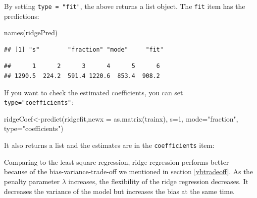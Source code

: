 \documentclass[
  12pt,
]{krantz}
\makeatletter
\newenvironment{Shaded}{\begin{snugshade}}{\end{snugshade}}
\newcommand{\AttributeTok}[1]{\textcolor[rgb]{0.61,0.61,0.61}{#1}}
\newcommand{\CommentTok}[1]{\textcolor[rgb]{0.37,0.37,0.37}{\textit{#1}}}
\newcommand{\DecValTok}[1]{\textcolor[rgb]{0.06,0.06,0.06}{#1}}
\newcommand{\FunctionTok}[1]{\textcolor[rgb]{0,0,0}{#1}}
\newcommand{\NormalTok}[1]{#1}
\newcommand{\OtherTok}[1]{\textcolor[rgb]{0.37,0.37,0.37}{#1}}
\newcommand{\SpecialCharTok}[1]{\textcolor[rgb]{0,0,0}{#1}}
\newcommand{\StringTok}[1]{\textcolor[rgb]{0.5,0.5,0.5}{#1}}
\newenvironment{kframe}{%
\medskip{}
\setlength{\fboxsep}{.8em}
 \def\at@end@of@kframe{}%
 \ifinner\ifhmode%
  \def\at@end@of@kframe{\end{minipage}}%
  \begin{minipage}{\columnwidth}%
 \fi\fi%
 \def\FrameCommand##1{\hskip\@totalleftmargin \hskip-\fboxsep
 \colorbox{shadecolor}{##1}\hskip-\fboxsep
     \hskip-\linewidth \hskip-\@totalleftmargin \hskip\columnwidth}%
 \MakeFramed {\advance\hsize-\width
   \@totalleftmargin\z@ \linewidth\hsize
   \@setminipage}}%
 {\par\unskip\endMakeFramed%
 \at@end@of@kframe}
\renewenvironment{Shaded}{\begin{kframe}}{\end{kframe}}
\makeatother
\begin{document}
By setting \texttt{type\ =\ "fit"}, the above returns a list object. The \texttt{fit} item has the predictions:

\begin{Shaded}
\begin{Highlighting}[]
\FunctionTok{names}\NormalTok{(ridgePred)}
\end{Highlighting}
\end{Shaded}

\begin{verbatim}
## [1] "s"        "fraction" "mode"     "fit"
\end{verbatim}

\begin{Shaded}
\end{Shaded}

\begin{verbatim}
##      1      2      3      4      5      6 
## 1290.5  224.2  591.4 1220.6  853.4  908.2
\end{verbatim}

If you want to check the estimated coefficients, you can set \texttt{type="coefficients"}:

\begin{Shaded}
\begin{Highlighting}[]
\NormalTok{ridgeCoef}\OtherTok{\textless{}{-}}\FunctionTok{predict}\NormalTok{(ridgefit,}\AttributeTok{newx =} \FunctionTok{as.matrix}\NormalTok{(trainx), }
                   \AttributeTok{s=}\DecValTok{1}\NormalTok{, }\AttributeTok{mode=}\StringTok{"fraction"}\NormalTok{, }\AttributeTok{type=}\StringTok{"coefficients"}\NormalTok{)}
\end{Highlighting}
\end{Shaded}

It also returns a list and the estimates are in the \texttt{coefficients} item:

\begin{Shaded}
\end{Shaded}

Comparing to the least square regression, ridge regression performs better because of the bias-variance-trade-off we mentioned in section \ref{vbtradeoff}. As the penalty parameter \(\lambda\) increases, the flexibility of the ridge regression decreases. It decreases the variance of the model but increases the bias at the same time.
\end{document}
